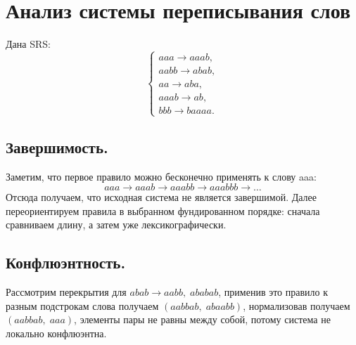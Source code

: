\documentclass[12pt]{article}
\begin{document}
\section*{Анализ системы переписывания слов}

Дана SRS:
\[
\begin{cases}
aaa \to aaab,\\
aabb \to abab,\\
aa \to aba,\\
aaab \to ab,\\
bbb \to baaaa.
\end{cases}
\]

\subsection*{Завершимость.}
Заметим, что первое правило можно бесконечно применять к слову aaa: 
\[
aaa \to aaab \to aaabb \to aaabbb \to \ldots
\]
Отсюда получаем, что исходная система не является завершимой. Далее переориентируем правила в выбранном фундированном порядке: сначала сравниваем длину, а затем уже лексикографически.

\subsection*{Конфлюэнтность.}
Рассмотрим перекрытия для \(abab \to aabb,\; ababab\), применив это правило к разным подстрокам слова получаем \((aabbab,\; abaabb)\), нормализовав получаем \((aabbab,\; aaa)\), элементы пары не равны между собой, потому система не локально конфлюэнтна.
\end{document}
